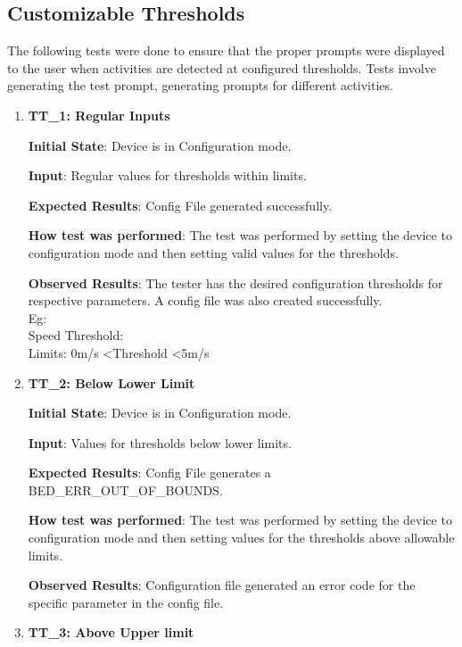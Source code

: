 \documentclass[12pt, titlepage]{article}
\begin{document}
\subsection{Customizable Thresholds}

The following tests were done to ensure that the proper prompts were displayed to the user when activities are detected at configured thresholds. Tests involve generating the test prompt, generating prompts for different activities.

\begin{enumerate}
  \item{\textbf{TT\_1: Regular Inputs} \\}\label{TT1}

  \textbf{Initial State}: Device is in Configuration mode.

  \textbf{Input}: Regular values for thresholds within limits.

  \textbf{Expected Results}: Config File generated successfully.

  \textbf{How test was performed}: The test was performed by setting the device to configuration mode and then setting valid values for the thresholds.

  \textbf{Observed Results}: The tester has the desired configuration thresholds for respective parameters. A config file was also created successfully. \\
  Eg: \\
  Speed Threshold:\\
  Limits: 0m/s \textless Threshold \textless 5m/s

  \item{\textbf{TT\_2: Below Lower Limit} \\}\label{TT2}

  \textbf{Initial State}: Device is in Configuration mode.

  \textbf{Input}: Values for thresholds below lower limits.

  \textbf{Expected Results}: Config File generates a BED\_ERR\_OUT\_OF\_BOUNDS.

  \textbf{How test was performed}: The test was performed by setting the device to configuration mode and then setting values for the thresholds above allowable limits.

  \textbf{Observed Results}: Configuration file generated an error code for the specific parameter in the config file.

  \item{\textbf{TT\_3: Above Upper limit }\\}\label{TT3}


\end{enumerate}
\end{document}

